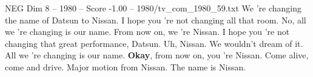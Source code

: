 \begin{textsample}{NEG Dim 8 – 1980 – Score -1.00 – 1980/tv\_com\_1980\_59.txt}  \label{ex:f8_neg_057}
We 're changing the name of Datsun to Nissan.
I hope you 're not changing all that room.
No, all we 're changing is our name.
From now on, we 're Nissan.
I hope you 're not changing that great performance, Datsun.
Uh, Nissan.
We wouldn't dream of it.
All we 're changing is our name. \textbf{Okay}, from now on, you 're Nissan.
Come alive, come and drive.
Major motion from Nissan.
The name is Nissan.

\end{textsample}
